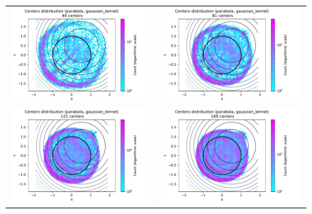 \documentclass[12pt]{report} %
\begin{document}
\begin{figure}[h]
  \hspace*{-2cm}
  \begin{tabular}{cc}
    \includegraphics[width=.6\textwidth]{imagenes/experiments/2d/statistical_2d_full_scheduler_interpolation/parabola/circle_c49_parabola_gaussian_kernel.pdf} &
    \includegraphics[width=.6\textwidth]{imagenes/experiments/2d/statistical_2d_full_scheduler_interpolation/parabola/circle_c81_parabola_gaussian_kernel.pdf} \\
    \includegraphics[width=.6\textwidth]{imagenes/experiments/2d/statistical_2d_full_scheduler_interpolation/parabola/circle_c121_parabola_gaussian_kernel.pdf} &
    \includegraphics[width=.6\textwidth]{imagenes/experiments/2d/statistical_2d_full_scheduler_interpolation/parabola/circle_c169_parabola_gaussian_kernel.pdf}\\

\end{tabular}
\end{figure}
\end{document}

